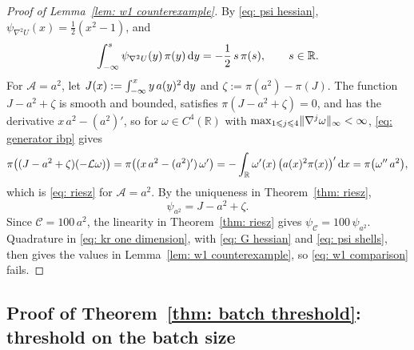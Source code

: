 \begin{proof}[Proof of Lemma~\ref{lem: w1 counterexample}]
    By \eqref{eq: psi hessian}, $\psi_{\nabla^2 U}(x) = \frac12 (x^2 - 1)$, and
    \begin{equation}
        \int_{-\infty}^s \psi_{\nabla^2 U}(y)\, \pi(y)\, \mathrm{d} y = -\frac12\, s\, \pi(s) , \qquad s \in \mathbb R .
        \label{eq: G hessian}
    \end{equation}
    For $\mathcal A = a^2$, let $J(x) := \int_{-\infty}^x y\, a(y)^2\, \mathrm{d} y$ and $\zeta := \pi(a^2) - \pi(J)$. The function $J - a^2 + \zeta$ is smooth and bounded, satisfies $\pi(J - a^2 + \zeta) = 0$, and has the derivative $x\, a^2 - (a^2)'$, so for $\omega \in C^4(\mathbb R)$ with $\max_{1 \leqslant j \leqslant 4} \lVert \nabla^j \omega \rVert_\infty < \infty$, \eqref{eq: generator ibp} gives
    \begin{equation*}
        \pi\bigl( (J - a^2 + \zeta) (-\mathcal L \omega) \bigr) = \pi\bigl( (x\, a^2 - (a^2)')\, \omega' \bigr) = -\int_{\mathbb R} \omega'(x)\, \bigl( a(x)^2 \pi(x) \bigr)'\, \mathrm{d} x = \pi\bigl( \omega''\, a^2 \bigr) ,
    \end{equation*}
    which is \eqref{eq: riesz} for $\mathcal A = a^2$. By the uniqueness in Theorem~\ref{thm: riesz},
    \begin{equation}
        \psi_{a^2} = J - a^2 + \zeta .
        \label{eq: psi shells}
    \end{equation}
    Since $\mathcal C = 100\, a^2$, the linearity in Theorem~\ref{thm: riesz} gives $\psi_{\mathcal C} = 100\, \psi_{a^2}$. Quadrature in \eqref{eq: kr one dimension}, with \eqref{eq: G hessian} and \eqref{eq: psi shells}, then gives the values in Lemma~\ref{lem: w1 counterexample}, so \eqref{eq: w1 comparison} fails.
\end{proof}


\subsection{Proof of Theorem~\ref{thm: batch threshold}: threshold on the batch size}
\label{sec: batch threshold proof}

